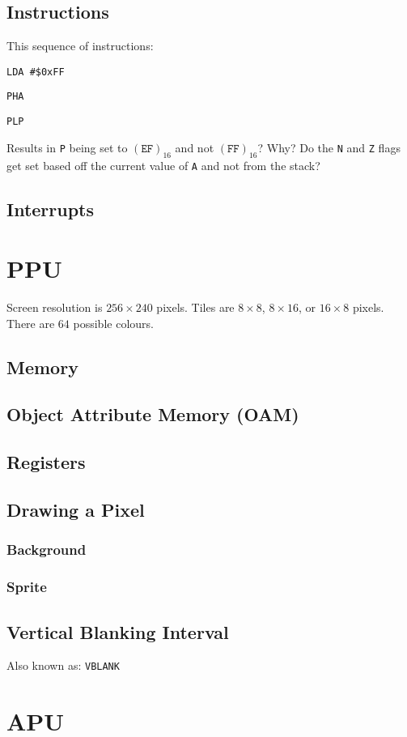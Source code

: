 \documentclass[10pt, draft]{book}
\begin{document}
  \section{Instructions}

  This sequence of instructions:

  \texttt{LDA \#\$0xFF}

  \texttt{PHA}

  \texttt{PLP}

  \noindent Results in \texttt{P} being set to $(\texttt{EF})_{16}$ and not
  $(\texttt{FF})_{16}$? Why? Do the \texttt{N} and \texttt{Z} flags get set
  based off the current value of \texttt{A} and not from the stack?

  \section{Interrupts}

  \chapter{PPU}

  Screen resolution is $256 \times 240$ pixels.
  Tiles are $8 \times 8$, $8 \times 16$, or $16 \times 8$ pixels.
  There are $64$ possible colours.

  \section{Memory}

  \section{Object Attribute Memory (OAM)}

  \section{Registers}

  \section{Drawing a Pixel}

  \subsection{Background}

  \subsection{Sprite}

  \section{Vertical Blanking Interval}

  Also known as: \texttt{VBLANK}

  \chapter{APU}
\end{document}

